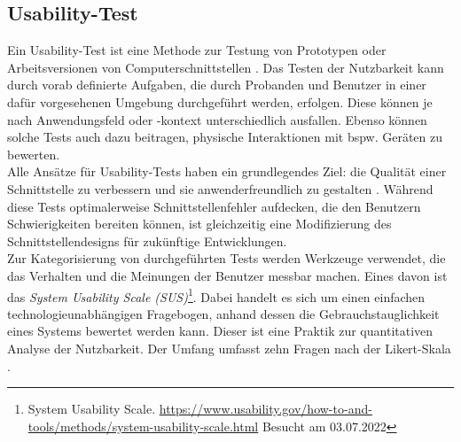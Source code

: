     \subsection{Usability-Test}
    \label{subsec:usabilitytests}
        Ein Usability-Test ist eine Methode zur Testung von Prototypen oder Arbeitsversionen von Computerschnittstellen \cite{LAZAR2017263}. 
        Das Testen der Nutzbarkeit kann durch vorab definierte Aufgaben, die durch Probanden und Benutzer in einer dafür vorgesehenen 
        Umgebung durchgeführt werden, erfolgen. Diese können je nach Anwendungsfeld oder -kontext unterschiedlich ausfallen. 
        Ebenso können solche Tests auch dazu beitragen, physische Interaktionen mit bspw. Geräten zu bewerten. 
        \\
        Alle Ansätze für Usability-Tests haben ein grundlegendes Ziel: die Qualität einer Schnittstelle zu verbessern und sie anwenderfreundlich zu 
        gestalten \cite{LAZAR2017263}. Während diese Tests optimalerweise Schnittstellenfehler aufdecken, die den Benutzern Schwierigkeiten bereiten 
        können, ist gleichzeitig eine Modifizierung des Schnittstellendesigns für zukünftige Entwicklungen. 
        \\
        \linebreak
        \linebreak
        Zur Kategorisierung von durchgeführten Tests werden Werkzeuge verwendet, die das Verhalten und die Meinungen der Benutzer 
        messbar machen. Eines davon ist das \textit{System Usability Scale (SUS)}\footnote{System Usability Scale. \url{https://www.usability.gov/how-to-and-tools/methods/system-usability-scale.html} Besucht am 03.07.2022}. 
        Dabei handelt es sich um einen einfachen 
        technologieunabhängigen Fragebogen, anhand dessen die Gebrauchstauglichkeit eines Systems bewertet werden kann. Dieser 
        ist eine Praktik zur quantitativen Analyse der Nutzbarkeit. Der Umfang umfasst zehn Fragen nach der Likert-Skala \cite{likert1932technique}.

